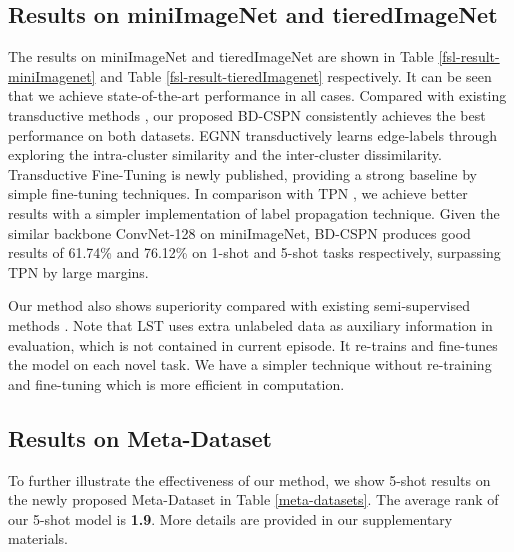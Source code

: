 \documentclass[runningheads]{llncs}
\begin{document}
\subsection{Results on miniImageNet and tieredImageNet}
The results on miniImageNet and tieredImageNet are shown in Table \ref{fsl-result-miniImagenet} and Table \ref{fsl-result-tieredImagenet} respectively. It can be seen that we achieve state-of-the-art performance in all cases.  
Compared with existing transductive methods \cite{liu2019learning,kim2019edge,dhillon2020a}, our proposed BD-CSPN consistently achieves the best performance on both datasets. EGNN \cite{kim2019edge} transductively learns edge-labels through exploring the intra-cluster similarity and the inter-cluster dissimilarity. Transductive Fine-Tuning \cite{dhillon2020a} is newly published, providing a strong baseline by simple fine-tuning techniques.
In comparison with TPN \cite{liu2019learning}, we achieve better results with a simpler implementation of label propagation technique. Given the similar backbone ConvNet-128 on miniImageNet, BD-CSPN produces good results of 61.74\% and 76.12\% on 1-shot and 5-shot tasks respectively, surpassing TPN by large margins.

Our method also shows superiority compared with existing semi-supervised methods \cite{ren2018meta,li2019learning}. Note that LST \cite{li2019learning} uses extra unlabeled data as auxiliary information in evaluation, which is not contained in current episode. It re-trains and fine-tunes the model on each novel task. We have a simpler technique without re-training and fine-tuning which is more efficient in computation. 

\subsection{Results on Meta-Dataset}
To further illustrate the effectiveness of our method, we show 5-shot results on the newly proposed Meta-Dataset \cite{triantafillou2020meta} in Table \ref{meta-datasets}. The average rank of our 5-shot model is \textbf{1.9}. More details are provided in our supplementary materials.
\begin{table}
\centering
\caption{5-shot results on Meta-Dataset: the model is trained on ILSVRC-2012 only and test on the listed test sources. }
\label{meta-datasets}
\end{table}
\end{document}

